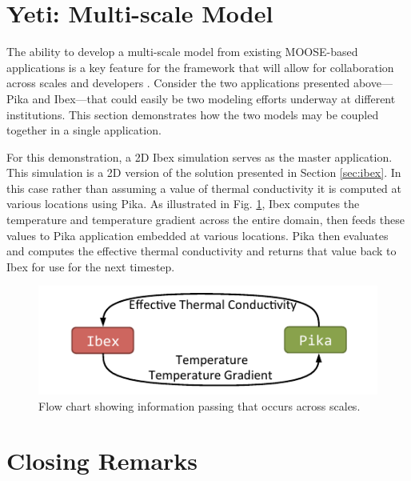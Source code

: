 \section{Yeti: Multi-scale Model}\label{sec:yeti}
The ability to develop a multi-scale model from existing MOOSE-based applications is a key feature for the framework that will allow for collaboration across scales and developers \citet{gaston2014physics}. Consider the two applications presented above---Pika and Ibex---that could easily be two modeling efforts underway at different institutions. This section demonstrates how the two models may be coupled together in a single application.

For this demonstration, a 2D Ibex simulation serves as the master application. This simulation is a 2D version of the solution presented in Section \ref{sec:ibex}. In this case rather than assuming a value of thermal conductivity it is computed at various locations using Pika. As illustrated in Fig. \ref{fig:yeti_flow}, Ibex computes the temperature and temperature gradient across the entire domain, then feeds these values to Pika application embedded at various locations. Pika then evaluates and computes the effective thermal conductivity and returns that value back to Ibex for use for the next timestep.

\begin{figure}[H]
  \includegraphics[width=\linewidth]{figures/flow.pdf}
  \caption{Flow chart showing information passing that occurs across scales.}
  \label{fig:yeti_flow}
\end{figure}


\section{Closing Remarks}
